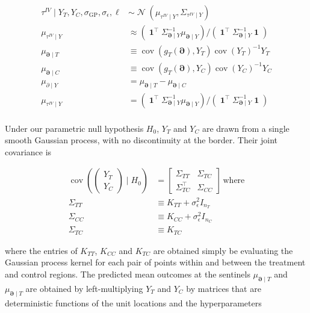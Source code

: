 \documentclass[letter]{article}
\newcommand{\genericdel}[3]{%
      \left#1#3\right#2
    }
\newcommand{\del}[1]{\genericdel(){#1}}
\DeclareMathOperator{\cov}{{cov}}
\DeclareMathOperator{\normal}{\mathcal{N}}
\DeclareMathOperator{\ones}{\mathbf{1}}
\newcommand{\trans}{^{\intercal}}
\newcommand{\sigmaf}{\sigma_{\mathrm{GP}}}
\newcommand{\sigman}{\sigma_{\epsilon}}
\newcommand{\boundary}{\partial}
\newcommand{\sentinels}{\bm{\boundary}}
\newcommand{\invvar}{\tau^{IV}}
\begin{document}
\begin{equation}\begin{split}
    \invvar \mid Y_T, Y_C, \sigmaf, \sigman, \ell &\sim \normal\del{\mu_{\invvar \mid Y}, \Sigma_{\invvar \mid Y}} \\
    \mu_{\invvar \mid Y} &\approx \del{\ones\trans \Sigma_{\sentinels \mid Y}^{-1} \mu_{\sentinels \mid Y}} \big/ \del{\ones\trans \Sigma_{\sentinels \mid Y}^{-1} \ones}  \\
    \mu_{\sentinels \mid T} &\equiv \cov\del{g_T(\sentinels), Y_T} \cov\del{Y_T}^{-1}  Y_T \\
    \mu_{\sentinels \mid C} &\equiv \cov\del{g_T(\sentinels), Y_C} \cov\del{Y_C}^{-1}  Y_C \\
    \mu_{\boundary \mid Y} &=  \mu_{\sentinels \mid T} - \mu_{\sentinels \mid C} \\
    \mu_{\invvar \mid Y} &= \del{\ones\trans \Sigma_{\sentinels \mid Y}^{-1} \mu_{\sentinels \mid Y}} \big/ \del{\ones\trans \Sigma_{\sentinels \mid Y}^{-1} \ones}  \\
\end{split}\end{equation}
    


    	Under our parametric null hypothesis \(H_0\), \(Y_T\) and \(Y_C\) are drawn from a single smooth Gaussian process, with no discontinuity at the border.
Their joint covariance is

\begin{equation}
\begin{aligned}
    \cov \del{\begin{pmatrix}Y_T \\ Y_C\end{pmatrix} \mid H_0 } &= \begin{bmatrix}
                        \Sigma_{TT} & \Sigma_{TC} \\
                        \Sigma\trans_{TC} & \Sigma_{CC}
                    \end{bmatrix}\,\text{where} \\
    \Sigma_{TT} &\equiv K_{TT} + \sigman^2 I_{n_T} \\
    \Sigma_{CC} &\equiv K_{CC} + \sigman^2 I_{n_C} \\
    \Sigma_{TC} &\equiv K_{TC}
\end{aligned}
\end{equation}

where the entries of \(K_{TT}\), \(K_{CC}\) and \(K_{TC}\) are obtained simply be evaluating the Gaussian process kernel for each pair of points within and between the treatment and control regions.
The predicted mean outcomes at the sentinels \(\mu_{\sentinels \mid T}\) and \(\mu_{\sentinels \mid T}\) are obtained by left-multiplying \(Y_T\) and \(Y_C\) by matrices that are deterministic functions of the unit locations and the hyperparameters
\end{document}
